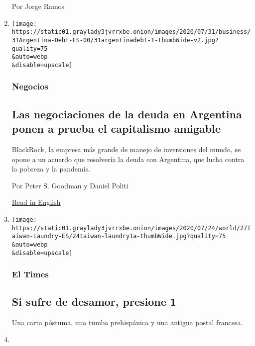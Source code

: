 \begin{enumerate}
  Por Jorge Ramos
\item
  \href{/es/2020/07/31/espanol/negocios/argentina-deuda.html}{}

  \texttt{[image: https://static01.graylady3jvrrxbe.onion/images/2020/07/31/business/31Argentina-Debt-ES-00/31argentinadebt-1-thumbWide-v2.jpg?quality=75\\\&auto=webp\\\&disable=upscale]}

  \hypertarget{negocios}{%
  \subsubsection{Negocios}\label{negocios}}

  \hypertarget{las-negociaciones-de-la-deuda-en-argentina-ponen-a-prueba-el-capitalismo-amigable}{%
  \subsection{Las negociaciones de la deuda en Argentina ponen a prueba
  el capitalismo
  amigable}\label{las-negociaciones-de-la-deuda-en-argentina-ponen-a-prueba-el-capitalismo-amigable}}

  BlackRock, la empresa más grande de manejo de inversiones del mundo,
  se opone a un acuerdo que resolvería la deuda con Argentina, que lucha
  contra la pobreza y la pandemia.

  Por Peter S. Goodman y Daniel Politi

  \href{https://www.nytimes3xbfgragh.onion/2020/07/31/business/argentina-debt.html}{Read
  in English}
\item
  \href{/es/2020/07/31/espanol/elecciones-2020-trump-mexico-violencia.html}{}

  \texttt{[image: https://static01.graylady3jvrrxbe.onion/images/2020/07/24/world/27Taiwan-Laundry-ES/24taiwan-laundry1a-thumbWide.jpg?quality=75\\\&auto=webp\\\&disable=upscale]}

  \hypertarget{el-times-1}{%
  \subsubsection{El Times}\label{el-times-1}}

  \hypertarget{si-sufre-de-desamor-presione-1}{%
  \subsection{Si sufre de desamor, presione
  1}\label{si-sufre-de-desamor-presione-1}}

  Una carta póstuma, una tumba prehispánica y una antigua postal
  francesa.
\item
  \href{/es/2020/07/31/espanol/estados-unidos/fred-trump-donald-trump.html}{}


\end{enumerate}
